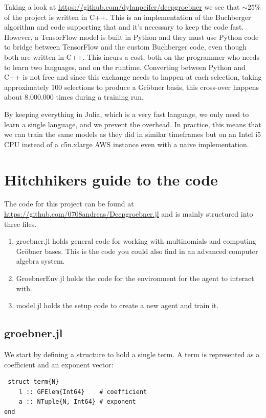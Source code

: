 \documentclass{article}
\theoremstyle{changedot}
\theoremstyle{changedotbreak}
\theoremstyle{nonumberplain}
\begin{document}
Taking a look at \url{https://github.com/dylanpeifer/deepgroebner} we see that $\sim 25\%$ of the project is written in C++. This is an implementation of the Buchberger algorithm and code supporting that and it's necessary to keep the code fast. However, a TensorFlow model is built in Python and they must use Python code to bridge between TensorFlow and the custom Buchberger code, even though both are written in C++. This incurs a cost, both on the programmer who needs to learn two languages, and on the runtime. Converting between Python and C++ is not free and since this exchange needs to happen at each selection, taking approximately 100 selections to produce a Gröbner basis, this cross-over happens about 8.000.000 times during a training run.

By keeping everything in Julia, which is a very fast language, we only need to learn a single language, and we prevent the overhead. In practice, this means that we can train the same models as they did in similar timeframes but on an Intel i5 CPU instead of a c5n.xlarge AWS instance even with a naive implementation.


\section{Hitchhikers guide to the code}
The code for this project can be found at \url{https://github.com/0708andreas/Deepgroebner.jl} and is mainly structured into three files.

\begin{enumerate}
  \item groebner.jl holds general code for working with multinomials and computing Gröbner bases. This is the code you could also find in an advanced computer algebra system.

  \item GroebnerEnv.jl holds the code for the environment for the agent to interact with.

  \item model.jl holds the setup code to create a new agent and train it.
    
\end{enumerate}

\subsection{groebner.jl}

We start by defining a structure to hold a single term. A term is represented as a coefficient and an exponent vector:
\begin{verbatim}
 struct term{N}
    l :: GFElem{Int64}    # coefficient
    a :: NTuple{N, Int64} # exponent
end
\end{verbatim}
\end{document}
